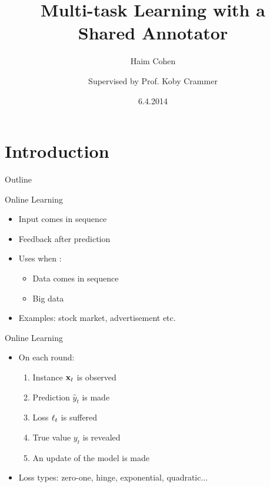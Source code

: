 \documentclass{beamer}
\title []{Multi-task Learning with a  \\Shared Annotator}    %
\author [H. Cohen and K. Crammer]{Haim Cohen \and \newline\newline  Supervised by Prof. Koby Crammer\newline\newline}
\institute [Technion]{Faculty of Electrical Engineering, Technion\\
Israel Institute of Technology}
\date[April 6th, 2014]{6.4.2014}
\begin{document}
\maketitle
\section{Introduction}

\begin{frame}{Outline}
  \tableofcontents[pausesections]
\end{frame}


\begin{frame}{Online Learning}
\begin{itemize}
\item Input  comes in sequence \newline
\item Feedback after prediction  \newline
\item   Uses when  : \newline
\begin{itemize}
\item Data comes in sequence \newline
\item Big data \newline
\end{itemize}
\item Examples: stock market, advertisement etc.\newline

\end{itemize}
\end{frame}


\begin{frame}{Online Learning}
\begin{itemize}
\item On each round:\newline
\begin{enumerate}
\item Instance $\mathbf{x}_{t}$ is observed\newline
\item Prediction $\hat{y}_t$ is made\newline
\item Loss $\ell_{t}$ is suffered\newline
\item True value $y_t$ is revealed\newline
\item An update of the model is made\newline
\end{enumerate}
\item Loss types: zero-one, hinge, exponential, quadratic...
\end{itemize}
\end{frame}
\end{document}
